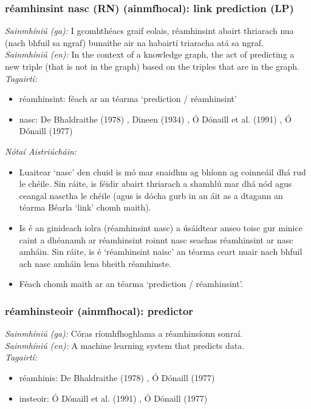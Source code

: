 \subsubsection*{réamhinsint nasc (RN) (ainmfhocal): link prediction (LP)}
 \noindent \textit{Sainmhíniú (ga):} I gcomhthéacs graif eolais, réamhinsint abairt thriarach nua (nach bhfuil sa ngraf) bunaithe air na habairtí triaracha atá sa ngraf.
\\
 \noindent \textit{Sainmhíniú (en):} In the context of a knowledge graph, the act of predicting a new triple (that is not in the graph) based on the triples that are in the graph.
\\
 \noindent \textit{Tagairtí:}
\begin{itemize}
	\item réamhinsint: féach ar an téarma `prediction / réamhinsint'
	\item nasc: De Bhaldraithe (1978) \cite{de-bhaldraithe}, Dineen (1934) \cite{dineen}, Ó Dónaill et al. (1991) \cite{focloir-beag}, Ó Dónaill (1977) \cite{odonaill}
\end{itemize}

 \noindent \textit{Nótaí Aistriúcháin:}
\begin{itemize}
	\item Luaitear `nasc' den chuid is mó mar snaidhm ag bhíonn ag coinneáil dhá rud le chéile. Sin ráite, is féidir abairt thriarach a shamhlú mar dhá nód agus ceangal nasctha le chéile (agus is dócha gurb in an áit as a dtagann an téarma Béarla `link' chomh maith).
	\item Is é an ginideach iolra (réamhinsint nasc) a úsáidtear anseo toisc gur minice caint a dhéanamh ar réamhinsint roinnt nasc seachas réamhinsint ar nasc amháin. Sin ráite, is é `réamhinsint naisc' an téarma ceart nuair nach bhfuil ach nasc amháin lena bheith réamhinste.
	\item Féach chomh maith ar an téarma `prediction / réamhinsint'.
\end{itemize}


\subsubsection*{réamhinsteoir (ainmfhocal): predictor}
 \noindent \textit{Sainmhíniú (ga):} Córas ríomhfhoghlama a réamhinsíonn sonraí.
\\
 \noindent \textit{Sainmhíniú (en):} A machine learning system that predicts data.
\\
 \noindent \textit{Tagairtí:}
\begin{itemize}
	\item réamhinis: De Bhaldraithe (1978) \cite{de-bhaldraithe}, Ó Dónaill (1977) \cite{odonaill}
	\item insteoir: Ó Dónaill et al. (1991) \cite{focloir-beag}, Ó Dónaill (1977) \cite{odonaill}
\end{itemize}

